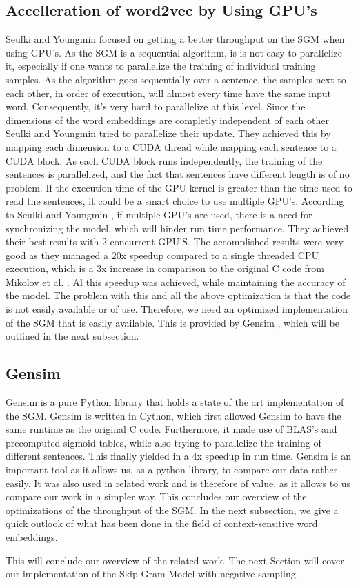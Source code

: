 \subsection{Accelleration of word2vec by Using GPU's}
Seulki and Youngmin \cite{gpu} focused on getting a better throughput on the SGM when using GPU's. As the SGM is a sequential algorithm, is is not easy to parallelize it, especially if one wants to parallelize the training of individual training samples. As the algorithm goes sequentially over a sentence, the samples next to each other, in order of execution, will almost every time have the same input word. Consequently, it's very hard to parallelize at this level. 
Since the dimensions of the word embeddings are completly independent of each other  Seulki and Youngmin \cite{gpu} tried to parallelize their update. They achieved this by mapping each dimension to a CUDA thread while mapping each sentence to a CUDA block. As each CUDA block runs independently, the training of the sentences is parallelized, and the fact that sentences have different length is of no problem. If the execution time of the GPU kernel is greater than the time used to read the sentences, it could be a smart choice to use multiple GPU's. According to Seulki and Youngmin \cite{gpu}, if multiple GPU's are used, there is a need for synchronizing the model, which will hinder run time performance. They achieved their best results with 2 concurrent GPU'S. The accomplished results were very good as they managed a 20x speedup compared to a single threaded CPU execution, which is a 3x increase in comparison to the original C code from Mikolov et al. \cite{mikolov2}. Al this speedup was achieved, while maintaining the accuracy of the model. The problem with this and all the above optimization is that the code is not easily available or of use. Therefore, we need an optimized implementation of the SGM that is easily available. This is provided by Gensim \cite{gensim}, which will be outlined in the next subsection.
\subsection{Gensim}\label{ssec:gensim}
Gensim \cite{gensim} is a pure Python library that holds a state of the art implementation of the SGM. Gensim is written in Cython, which first allowed Gensim to have the same runtime as the original C code. Furthermore, it made use of BLAS's and precomputed sigmoid tables, while also trying to parallelize the training of different sentences. This finally yielded in a 4x speedup in run time. Gensim is an important tool as it allows us, as a python library, to compare our data rather easily. It was also used in related work \cite{intel} and is therefore of value, as it allows to us compare our work in a simpler way. This concludes our overview of the optimizations of the throughput of the SGM. In the next subsection, we give a quick outlook of what has been done in the field of context-sensitive word embeddings.

This will conclude our overview of the related work. The next Section will cover our implementation of the Skip-Gram Model with negative sampling.